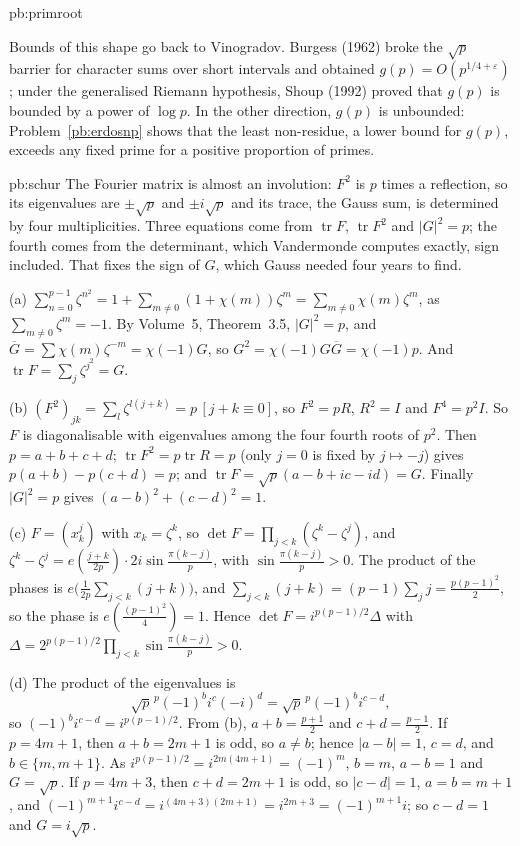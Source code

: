 \begin{solution}{pb:primroot}

\leads Bounds of this shape go back to Vinogradov. Burgess (1962) broke the $\sqrt p$ barrier for character sums over short intervals and obtained
$g(p)=O(p^{1/4+\varepsilon})$; under the generalised Riemann hypothesis, Shoup (1992) proved that $g(p)$ is bounded by a power of $\log p$. In the other direction, $g(p)$ is
unbounded: Problem~\ref{pb:erdosnp} shows that the least non-residue, a lower bound for $g(p)$, exceeds any fixed prime for a positive proportion of primes.
\end{solution}

\begin{solution}{pb:schur}
\idea The Fourier matrix is almost an involution: $F^2$ is $p$ times a reflection, so its eigenvalues are $\pm\sqrt p$ and $\pm i\sqrt p$ and its trace, the Gauss sum, is determined by
four multiplicities. Three equations come from $\operatorname{tr}F$, $\operatorname{tr}F^2$ and $|G|^2=p$; the fourth comes from the determinant, which Vandermonde computes exactly,
sign included. That fixes the sign of $G$, which Gauss needed four years to find.

\writeup (a) $\sum_{n=0}^{p-1}\zeta^{n^2}=1+\sum_{m\ne0}(1+\chi(m))\zeta^m=\sum_{m\ne0}\chi(m)\zeta^m$, as $\sum_{m\ne0}\zeta^m=-1$. By Volume~5, Theorem~3.5, $|G|^2=p$, and
$\overline G=\sum\chi(m)\zeta^{-m}=\chi(-1)G$, so $G^2=\chi(-1)G\overline G=\chi(-1)p$. And $\operatorname{tr}F=\sum_j\zeta^{j^2}=G$.

(b) $(F^2)_{jk}=\sum_l\zeta^{l(j+k)}=p\,[j+k\equiv0]$, so $F^2=pR$, $R^2=I$ and $F^4=p^2I$. So $F$ is diagonalisable with eigenvalues among the four fourth roots of $p^2$. Then
$p=a+b+c+d$; $\operatorname{tr}F^2=p\operatorname{tr}R=p$ (only $j=0$ is fixed by $j\mapsto-j$) gives $p(a+b)-p(c+d)=p$; and $\operatorname{tr}F=\sqrt p(a-b+ic-id)=G$. Finally
$|G|^2=p$ gives $(a-b)^2+(c-d)^2=1$.

(c) $F=(x_k^j)$ with $x_k=\zeta^k$, so $\det F=\prod_{j<k}(\zeta^k-\zeta^j)$, and $\zeta^k-\zeta^j=e(\frac{j+k}{2p})\cdot2i\sin\frac{\pi(k-j)}p$, with $\sin\frac{\pi(k-j)}p>0$. The
product of the phases is $e\bigl(\frac1{2p}\sum_{j<k}(j+k)\bigr)$, and $\sum_{j<k}(j+k)=(p-1)\sum_jj=\frac{p(p-1)^2}2$, so the phase is $e(\frac{(p-1)^2}4)=1$. Hence
$\det F=i^{p(p-1)/2}\Delta$ with $\Delta=2^{p(p-1)/2}\prod_{j<k}\sin\frac{\pi(k-j)}p>0$.

(d) The product of the eigenvalues is
\[
\sqrt p^{\,p}(-1)^bi^c(-i)^d=\sqrt p^{\,p}(-1)^bi^{c-d},
\]
so $(-1)^bi^{c-d}=i^{p(p-1)/2}$. From (b), $a+b=\frac{p+1}2$ and $c+d=\frac{p-1}2$.
If $p=4m+1$, then $a+b=2m+1$ is odd, so $a\ne b$; hence $|a-b|=1$, $c=d$, and $b\in\{m,m+1\}$. As $i^{p(p-1)/2}=i^{2m(4m+1)}=(-1)^m$, $b=m$, $a-b=1$ and $G=\sqrt p$. If $p=4m+3$,
then $c+d=2m+1$ is odd, so $|c-d|=1$, $a=b=m+1$, and $(-1)^{m+1}i^{c-d}=i^{(4m+3)(2m+1)}=i^{2m+3}=(-1)^{m+1}i$; so $c-d=1$ and $G=i\sqrt p$.


\end{solution}
